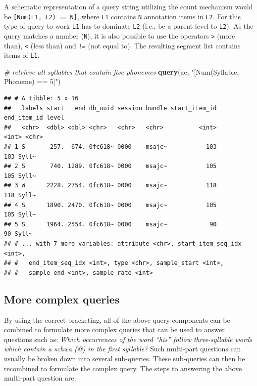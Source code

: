 \documentclass[]{book}
\newenvironment{Shaded}{\begin{snugshade}}{\end{snugshade}}
\newcommand{\CommentTok}[1]{\textcolor[rgb]{0.56,0.35,0.01}{\textit{#1}}}
\newcommand{\KeywordTok}[1]{\textcolor[rgb]{0.13,0.29,0.53}{\textbf{#1}}}
\newcommand{\NormalTok}[1]{#1}
\newcommand{\StringTok}[1]{\textcolor[rgb]{0.31,0.60,0.02}{#1}}
\begin{document}
A schematic representation of a query string utilizing the count mechanism would be \texttt{{[}Num(L1,\ L2)\ ==\ N{]}}, where \texttt{L1} contains \texttt{N} annotation items in \texttt{L2}. For this type of query to work \texttt{L1} has to dominate \texttt{L2} (i.e., be a parent level to \texttt{L2}). As the query matches a number (\texttt{N}), it is also possible to use the operators \texttt{\textgreater{}} (more than), \texttt{\textless{}} (less than) and \texttt{!=} (not equal to). The resulting segment list contains items of \texttt{L1}.

\begin{Shaded}
\begin{Highlighting}[]
\CommentTok{# retrieve all syllables that contain five phonemes}
\KeywordTok{query}\NormalTok{(ae, }\StringTok{"[Num(Syllable, Phoneme) == 5]"}\NormalTok{)}
\end{Highlighting}
\end{Shaded}

\begin{verbatim}
## # A tibble: 5 x 16
##   labels start   end db_uuid session bundle start_item_id end_item_id level
##   <chr>  <dbl> <dbl> <chr>   <chr>   <chr>          <int>       <int> <chr>
## 1 S       257.  674. 0fc618~ 0000    msajc~           103         103 Syll~
## 2 S       740. 1289. 0fc618~ 0000    msajc~           105         105 Syll~
## 3 W      2228. 2754. 0fc618~ 0000    msajc~           118         118 Syll~
## 4 S      1890. 2470. 0fc618~ 0000    msajc~           105         105 Syll~
## 5 S      1964. 2554. 0fc618~ 0000    msajc~            90          90 Syll~
## # ... with 7 more variables: attribute <chr>, start_item_seq_idx <int>,
## #   end_item_seq_idx <int>, type <chr>, sample_start <int>,
## #   sample_end <int>, sample_rate <int>
\end{verbatim}

\hypertarget{subsec:query_moreComplexQueries}{%
\subsection{More complex queries}\label{subsec:query_moreComplexQueries}}

By using the correct bracketing, all of the above query components can be combined to formulate more complex queries that can be used to answer questions such as: \emph{Which occurrences of the word ``his'' follow three-syllable words which contain a schwa (@) in the first syllable?} Such multi-part questions can usually be broken down into several sub-queries. These sub-queries can then be recombined to formulate the complex query. The steps to answering the above multi-part question are:
\end{document}
